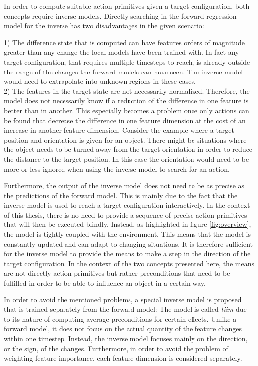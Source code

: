 In order to compute suitable action primitives given a target configuration, both concepts require inverse models.
Directly searching in the forward regression model for the inverse has two disadvantages in the given scenario: 

1) The difference state that is computed can have features orders of magnitude greater than any change the local models have been trained with. In fact any target configuration, that requires multiple timesteps to reach, is already outside the range of the changes the forward models can have seen. 
The inverse model would need to extrapolate into unknown regions in these cases. \\
2) The features in the target state are not necessarily normalized. Therefore, the model does not necessarily know if a reduction of the difference in one feature is better than in another. This especially becomes a problem once only actions can be found that decrease the difference in one feature dimension at the cost of an increase in another feature dimension. Consider the example where a target position and orientation is given for an object. There might be situations where the object needs to be turned away from the target orientation in order to reduce the distance to the target position. In this case the orientation would need to be more or less ignored when using the inverse model to search for an action.

Furthermore, the output of the inverse model does not need to be as precise as the predictions of the forward model. This is mainly due to the fact that the inverse model is used to reach a target configuration interactively. In the context of this thesis, there is no need to provide a sequence of precise action primitives that will then be executed blindly. Instead, as highlighted in figure \ref{fig:overview}, the model is tightly coupled with the environment. This means that the model is constantly updated and can adapt to changing situations. It is therefore sufficient for the inverse model to provide the means to make a step in the direction of the target configuration. In the context of the two concepts presented here, the means are not directly action primitives but rather preconditions that need to be fulfilled in order to be able to influence an object in a certain way.

In order to avoid the mentioned problems, a special inverse model is proposed that is trained separately from the forward model:
The model is called \textit{\gls{tiim}} due to its nature of computing average preconditions for certain effects.
Unlike a forward model, it does not focus on the actual quantity of the feature changes within one timestep. 
Instead, the inverse model focuses mainly on the direction, or the sign, of the changes. Furthermore, in order to avoid the problem of weighting feature importance, each feature dimension is considered separately. 

